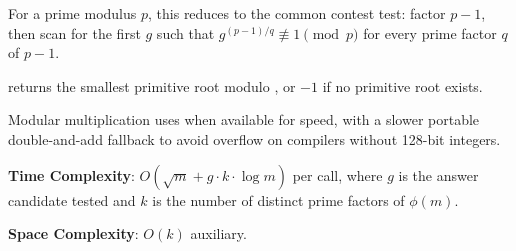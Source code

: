 For a prime modulus $p$, this reduces to the common contest test: factor $p - 1$, then scan for the first $g$ such that $g^{(p - 1)/q} \not\equiv 1 \pmod p$ for every prime factor $q$ of $p - 1$.

\begin{compactitem}
  \item {} returns the smallest primitive root modulo , or $-1$ if no primitive root exists.
\end{compactitem}

Modular multiplication uses  when available for speed, with a slower portable double-and-add fallback to avoid overflow on compilers without 128-bit integers.

\textbf{Time Complexity}: $O(\sqrt{m} + g \cdot k \cdot \log m)$ per call, where $g$ is the answer candidate tested and $k$ is the number of distinct prime factors of $\phi(m)$.

\textbf{Space Complexity}: $O(k)$ auxiliary.

